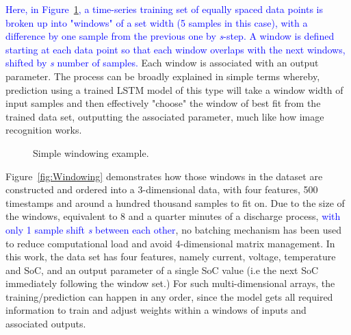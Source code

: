 %
%
\textcolor{blue}{Here, in Figure~\ref{fig:windowing_simple}, a time-series training set of equally spaced data points is broken up into "windows" of a set width (5 samples in this case), with a difference by one sample from the previous one by \textit{s}-step.
A window is defined starting at each data point so that each window overlaps with the next windows, shifted by \textit{s} number of samples.}
Each window is associated with an output parameter.
The process can be broadly explained in simple terms whereby, prediction using a trained LSTM model of this type will take a window width of input samples and then effectively "choose" the window of best fit from the trained data set, outputting the associated parameter, much like how image recognition works.
\begin{figure}[hbp]
    \centering
    
    \caption{Simple windowing example.}
    \label{fig:windowing_simple}
\end{figure}

\mbox{Figure~\ref{fig:Windowing}} demonstrates how those windows in the dataset are constructed and ordered into a 3-dimensional data, with four features, 500 timestamps and around a hundred thousand samples to fit on.
Due to the size of the windows, equivalent to 8 and a quarter minutes of a discharge process, \textcolor{blue}{with only 1 sample shift \textit{s} between each other}, no batching mechanism has been used to reduce computational load and avoid 4-dimensional matrix management.
In this work, the data set has four features, namely current, voltage, temperature and SoC, and an output parameter of a single SoC value (i.e the next SoC immediately following the window set.)
For such multi-dimensional arrays, the training/prediction can happen in any order, since the model gets all required information to train and adjust weights within a windows of inputs and associated outputs.

